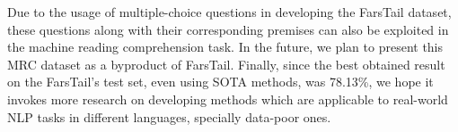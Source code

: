 \documentclass[preprint,12pt]{elsarticle}
\begin{document}
Due to the usage of multiple-choice questions in developing the FarsTail dataset, these questions along with their corresponding premises can also be exploited in the machine reading comprehension task. In the future, we plan to present this MRC dataset as a byproduct of FarsTail. 
Finally, since the best obtained result on the FarsTail's test set, even using SOTA methods, was 78.13\%, we hope it invokes more research on developing methods which are applicable to real-world NLP tasks in different languages, specially data-poor ones. 

 

\end{document}

